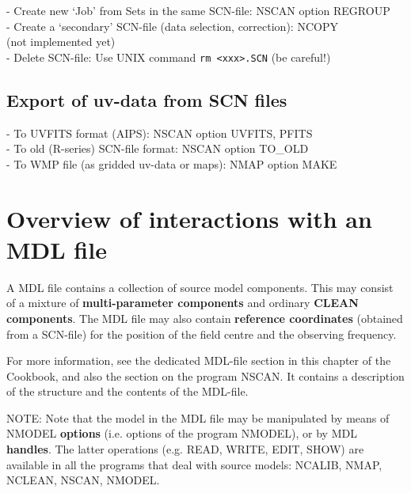 - Create new `Job' from Sets in the same SCN-file: NSCAN option REGROUP\\ 
- Create a `secondary' SCN-file (data selection, correction): NCOPY\\ 
  (not implemented yet)\\ 
- Delete SCN-file: Use UNIX command {\tt rm <xxx>.SCN} (be careful!)\\ 


\subsection{Export of uv-data from SCN files} 
\label{scn.export} 

- To UVFITS format (AIPS): NSCAN option UVFITS, PFITS\\ 
- To old (R-series) SCN-file format: NSCAN option TO\_OLD\\ 
- To WMP file (as gridded uv-data or maps): NMAP option MAKE\\ 




\section{Overview of interactions with an MDL file} 
\label{mdl.inter} 

	A MDL file contains a collection of source model components. 
This may consist of a mixture of {\bf multi-parameter components} and ordinary
{\bf CLEAN components}.  The MDL file may also contain {\bf reference
coordinates} (obtained from a SCN-file) for the position of the field centre
and the observing frequency. 

	For more information, see the dedicated MDL-file section in this
chapter of the Cookbook, and also the section on the program NSCAN.  It
contains a description of the structure and the contents of the 
MDL-file. 

	NOTE: Note that the model in the MDL file may be manipulated by means
of NMODEL {\bf options} (i.e.  options of the program NMODEL), or by MDL {\bf
handles}.  The latter operations (e.g.  READ, WRITE, EDIT, 
SHOW) are available in all the programs that deal with source models: 
NCALIB, NMAP, NCLEAN, NSCAN, NMODEL.


